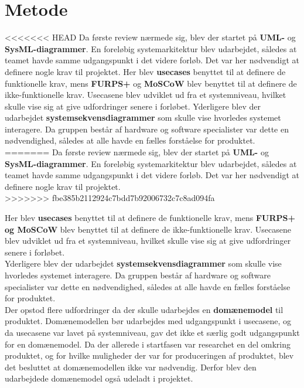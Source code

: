 \section{Metode}

<<<<<<< HEAD
Da første review nærmede sig, blev der startet på \textbf{UML-} og \textbf{SysML-diagrammer}. En foreløbig systemarkitektur blev udarbejdet, således at teamet havde samme udgangspunkt i det videre forløb. Det var her nødvendigt at definere nogle krav til projektet. Her blev \textbf{usecases} benyttet til at definere de funktionelle krav, mens \textbf{FURPS+} og \textbf{MoSCoW} blev benyttet til at definere de ikke-funktionelle krav. Usecasene blev udviklet ud fra et systemniveau, hvilket skulle vise sig at give udfordringer senere i forløbet.
Yderligere blev der udarbejdet \textbf{systemsekvensdiagrammer} som skulle vise hvorledes systemet interagere. Da gruppen består af hardware og software specialister var dette en nødvendighed, således at alle havde en fælles forståelse for produktet.
=======
Da første review nærmede sig, blev der startet på \textbf{UML-} og \textbf{SysML-diagrammer}. En foreløbig systemarkitektur blev udarbejdet, således at teamet havde samme udgangspunkt i det videre forløb. Det var her nødvendigt at definere nogle krav til projektet.\\
>>>>>>> fbe385b2112924c7bdd7b92006732c7c8ad094fa

Her blev \textbf{usecases} benyttet til at definere de funktionelle krav, mens \textbf{FURPS+ og MoSCoW} blev benyttet til at definere de ikke-funktionelle krav. Usecasene blev udviklet ud fra et systemniveau, hvilket skulle vise sig at give udfordringer senere i forløbet.\\

Yderligere blev der udarbejdet \textbf{systemsekvensdiagrammer} som skulle vise hvorledes systemet interagere. Da gruppen består af hardware og software specialister var dette en nødvendighed, således at alle havde en fælles forståelse for produktet.\\

Der opstod flere udfordringer da der skulle udarbejdes en \textbf{domænemodel} til produktet. Domænemodellen bør udarbejdes med udgangspunkt i usecasene, og da usecasene var lavet på systemniveau, gav det ikke et særlig godt udgangspunkt for en domænemodel. Da der allerede i startfasen var researchet en del omkring produktet, og for hvilke muligheder der var for produceringen af produktet, blev det besluttet at domænemodellen ikke var nødvendig. Derfor blev den udarbejdede domænemodel også udeladt i projektet.\\
 
